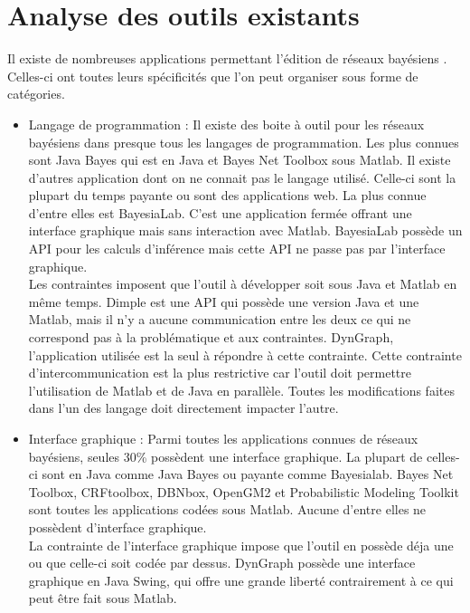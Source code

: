 \documentclass[conference]{IEEEtran}
\begin{document}
\section{Analyse des outils existants}
Il existe de nombreuses applications permettant l'édition de réseaux bayésiens \cite{murphylist}. Celles-ci ont toutes leurs spécificités que l'on peut organiser sous forme de catégories. \\
\begin{itemize}
	\item{Langage de programmation :} Il existe des boite à outil pour les réseaux bayésiens dans presque tous les langages de programmation. Les plus connues sont Java Bayes qui est en Java et Bayes Net Toolbox sous Matlab. Il existe d'autres application dont on ne connait pas le langage utilisé. Celle-ci sont la plupart du temps payante ou sont des applications web. La plus connue d'entre elles est BayesiaLab. C'est une application fermée offrant une interface graphique mais sans interaction avec Matlab. BayesiaLab possède un API pour les calculs d'inférence mais cette API ne passe pas par l'interface graphique. \\Les contraintes imposent que l'outil à développer soit sous Java et Matlab en même temps. Dimple est une API qui possède une version Java et une Matlab, mais il n'y a aucune communication entre les deux ce qui ne correspond pas à la problématique et aux contraintes. DynGraph, l'application utilisée est la seul à répondre à cette contrainte. Cette contrainte d'intercommunication est la plus restrictive car l'outil doit permettre l'utilisation de Matlab et de Java en parallèle. Toutes les modifications faites dans l'un des langage doit directement impacter l'autre. \\
	
	\item{Interface graphique :} Parmi toutes les applications connues de réseaux bayésiens, seules 30\% possèdent une interface graphique. La plupart de celles-ci sont en Java comme Java Bayes ou payante comme Bayesialab. Bayes Net Toolbox, CRFtoolbox, DBNbox, OpenGM2 et Probabilistic Modeling Toolkit sont toutes les applications codées sous Matlab. Aucune d'entre elles ne possèdent d'interface graphique.\\ 
	La contrainte de l'interface graphique impose que l'outil en possède déja une ou que celle-ci soit codée par dessus. DynGraph possède une interface graphique en Java Swing, qui offre une grande liberté contrairement à ce qui peut être fait sous Matlab. \\


\end{itemize}
\end{document}
